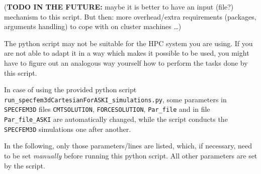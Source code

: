 \documentclass[12pt,a4paper]{article}
\newcommand{\lcode}[1]{\nolinkurl{#1}}
\begin{document}
({\bf TODO IN THE FUTURE:} maybe it is better to have an input (file?) mechanism to this script. But then: more
overhead/extra requirements (packages, arguments handling) to cope with on cluster machines \dots)

The python script may not be suitable for the HPC system you are using. If you are not able to adapt 
it in a way which makes it possible to be used, you might have to figure out an analogous way yourself 
how to perform the tasks done by this script.

In case of using the provided python script \lcode{run_specfem3dCartesianForASKI_simulations.py},
some parameters in \lcode{SPECFEM3D} files \lcode{CMTSOLUTION}, \lcode{FORCESOLUTION}, \lcode{Par_file} 
and in file \lcode{Par_file_ASKI} are automatically changed, while the script conducts the
\lcode{SPECFEM3D} simulations one after another.

In the following, only those parameters/lines are listed, which, if necessary, need to be set 
\emph{manually} before running this python script. All other parameters are set by the script.

\end{document}
